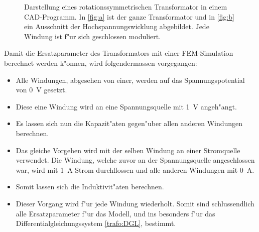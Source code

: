 \begin{refsection}
\begin{figure}
	\centering    
	\caption{Darstellung eines rotationssymmetrischen Transformator in einem CAD-Programm. In \ref{fig:a} ist der ganze Transformator und in \ref{fig:b} ein Ausschnitt der Hochspannungswicklung abgebildet. Jede Windung ist f"ur sich geschlossen moduliert.}
	\label{trafo:infolytica}
\end{figure}

Damit die Ersatzparameter des Transformators mit einer FEM-Simulation berechnet werden k"onnen, wird folgendermassen vorgegangen:
%
\begin{itemize}
	\item Alle Windungen, abgesehen von einer, werden auf das Spannungspotential von  \SI{0}{\volt} gesetzt. 
	\item Diese eine Windung wird an eine Spannungsquelle mit \SI{1}{\volt} angeh"angt.
	\item Es lassen sich nun die Kapazit"aten gegen"uber allen anderen Windungen berechnen.
	\item Das gleiche Vorgehen wird mit der selben Windung an einer Stromquelle verwendet. Die Windung, welche zuvor an der Spannungsquelle angeschlossen war, wird mit \SI{1}{\ampere} Strom durchflossen und alle anderen Windungen mit \SI{0}{\ampere}.
	\item Somit lassen sich die Induktivit"aten berechnen.
	\item Dieser Vorgang wird f"ur jede Windung wiederholt. Somit sind schlussendlich alle Ersatzparameter f"ur das Modell, und ins besonders f"ur das Differentialgleichungssystem \ref{trafo:DGL}, bestimmt.
\end{itemize}



\end{refsection}
